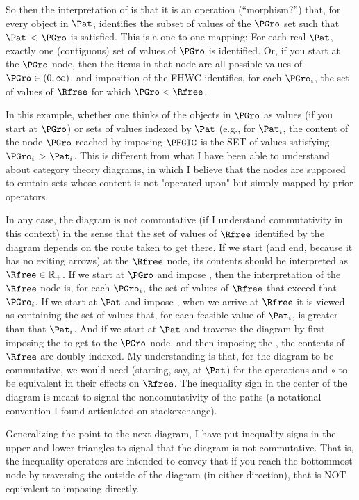 \documentclass[\econtexRoot/BufferStockTheory]{subfiles}
\begin{document}
\begin{Private}
So then the interpretation of {\PFGIC} is that it is an operation (``morphism?'') that, for every object in $\Pat$, identifies the subset of values of the $\PGro$ set such that $\Pat$ < $\PGro$ is satisfied. This is a one-to-one mapping: For each real $\Pat$, exactly one (contiguous) set of values of $\PGro$ is identified. Or, if you start at the $\PGro$ node, then the items in that node are all possible values of $\PGro \in (0,\infty)$, and imposition of the FHWC identifies, for each $\PGro_{i}$, the set of values of $\Rfree$ for which $\PGro < \Rfree$.

In this example, whether one thinks of the objects in $\PGro$ as values (if you start at $\PGro$) or sets of values indexed by $\Pat$ (e.g., for $\Pat_i$, the content of the node $\PGro$ reached by imposing $\PFGIC$ is the SET of values satisfying $\PGro_{i} $ > $\Pat_i$. This is different from what I have been able to understand about category theory diagrams, in which I believe that the nodes are supposed to contain sets whose content is not "operated upon" but simply mapped by prior operators.

In any case, the diagram is not commutative (if I understand commutativity in this context) in the sense that the set of values of $\Rfree$ identified by the diagram depends on the route taken to get there.  If we start (and end, because it has no exiting arrows) at the $\Rfree$ node, its contents should be interpreted as $\Rfree \in \mathbb{R}_{+}$.  If we start at $\PGro$ and impose {\FHWC}, then the interpretation of the $\Rfree$ node is, for each $\PGro_{i}$, the set of values of $\Rfree$ that exceed that $\PGro_{i}$.  If we start at $\Pat$ and impose {\RIC}, when we arrive at $\Rfree$ it is viewed as containing the set of values that, for each feasible value of $\Pat_{i}$, is greater than that $\Pat_{i}$. And if we start at $\Pat$ and traverse the diagram by first imposing the {\PFGIC} to get to the $\PGro$ node, and then imposing the {\FHWC}, the contents of $\Rfree$ are doubly indexed. My understanding is that, for the diagram to be commutative, we would need (starting, say, at $\Pat$) for the operations {\RIC} and {\PFGIC} $\circ$ {\FHWC} to be equivalent in their effects on $\Rfree$. The inequality sign in the center of the diagram is meant to signal the noncomutativity of the paths (a notational convention I found articulated on stackexchange).

Generalizing the point to the next diagram, I have put inequality signs in the upper and lower triangles to signal that the diagram is not commutative. That is, the inequality operators are intended to convey that if you reach the bottommost node by traversing the outside of the diagram (in either direction), that is NOT equivalent to imposing \PFFVAC directly.


\end{Private}
\end{document}
